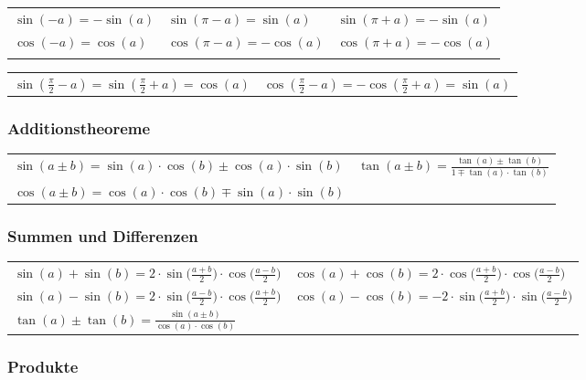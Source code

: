 \begin{tabular}{lll}
  $\sin(-a) = -\sin(a)$   & $\sin(\pi - a) = \sin(a)$     & $\sin(\pi + a) = -\sin(a)$ \\
  $\cos(-a) = \cos(a)$    & $\cos(\pi - a) = - \cos(a)$   & $\cos(\pi + a) = - \cos(a)$ \\
  \\
\end{tabular}

\begin{tabular}{ll}
  $\sin(\frac{\pi}{2} - a) = \sin(\frac{\pi}{2} + a) = \cos(a)$ & $\cos(\frac{\pi}{2} - a) = - \cos(\frac{\pi}{2} + a) = \sin(a)$
\end{tabular}

\subsubsection{Additionstheoreme}

\begin{tabular}{ll}
  $\sin(a \pm b) = \sin(a) \cdot \cos(b) \pm \cos(a) \cdot \sin(b)$   & $\tan(a \pm b) = \frac{\tan(a) \pm \tan(b)}{1 \mp \tan(a) \cdot \tan(b)}$\\
  $\cos(a \pm b) = \cos(a) \cdot \cos(b) \mp \sin(a) \cdot \sin(b)$   &
\end{tabular}

\subsubsection{Summen und Differenzen}

\renewcommand{\arraystretch}{1.5}
\begin{tabular}{ll@{}}
  $\sin(a) + \sin(b) = 2 \cdot \sin \big( \frac{a+b}{2} \big) \cdot \cos \big( \frac{a-b}{2} \big)$ &
  $\cos(a) + \cos(b) = 2 \cdot \cos \big( \frac{a+b}{2} \big) \cdot \cos \big( \frac{a-b}{2} \big)$ \\
  $\sin(a) - \sin(b) = 2 \cdot \sin \big( \frac{a-b}{2} \big) \cdot \cos \big( \frac{a+b}{2} \big)$ &
  $\cos(a) - \cos(b) = -2 \cdot \sin \big( \frac{a+b}{2} \big) \cdot \sin \big( \frac{a-b}{2} \big)$ \\
  $\tan(a) \pm \tan(b) = \frac{\sin(a \pm b)}{\cos(a) \cdot \cos(b)}$
\end{tabular}
\renewcommand{\arraystretch}{1}

\subsubsection{Produkte}


